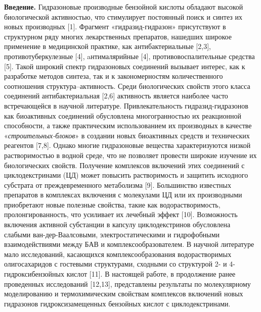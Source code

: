 \begin{multicols}{2}
{\bfseries Введение.} Гидразоновые производные бензойной кислоты обладают
высокой биологической активностью, что стимулирует постоянный поиск и
синтез их новых производных {[}1{]}. Фрагмент «гидразид-гидразон»
присутствуют в структурном ряду многих лекарственных препаратов,
нашедших широкое применение в медицинской практике, как
антибактериальные {[}2,3{]}, противотуберкулезные {[}4{]},
aнтималярийные {[}4{]}, противовоспалительные средства {[}5{]}. Такой
широкий спектр гидразоновых соединений вызывает интерес, как к
разработке методов синтеза, так и к закономерностям количественного
соотношения структура--активность. Среди биологических свойств этого
класса соединений антибактериальная {[}2,6{]} активность является
наиболее часто встречающейся в научной литературе. Привлекательность
гидразид-гидразонов как биоактивных соединений обусловлена
многогранностью их реакционной способности, а также практическим
использованием их производных в качестве «\emph{строительных-блоков}» в
создании новых биоактивных средств и технических реагентов {[}7,8{]}.
Однако многие гидразоновые вещества характеризуются низкой
растворимостью в водной среде, что не позволяет провести широкие
изучение их биологических свойств. Получение комплексов включений этих
соединений с циклодекстринами (ЦД) может повысить растворимость и
защитить исходного субстрата от преждевременного метаболизма {[}9{]}.
Большинство известных препаратов в комплексах включения с молекулами ЦД
или их производными приобретают новые полезные свойства, такие как
водорастворимость, пролонгированность, что усиливает их лечебный эффект
{[}10{]}. Возможность включения активной субстанции в капсулу
циклодекстринов обусловлена слабыми ван-дер-Ваалсовыми,
электростатическими и гидрофобными взаимодействиями между БАВ и
комплексообразователем. В научной литературе мало исследований,
касающихся комплексообразования водорастворимых олигосахаридов с
гостевыми структурами, сходными со структурой 2- и 4-гидроксибензойных
кислот {[}11{]}. В настоящей работе, в продолжение ранее проведенных
исследований {[}12,13{]}, представлены результаты по молекулярному
моделированию и термохимическим свойствам комплексов включений новых
гидразонов гидроксизамещенных бензойных кислот с циклодекстринами.


\end{multicols}
